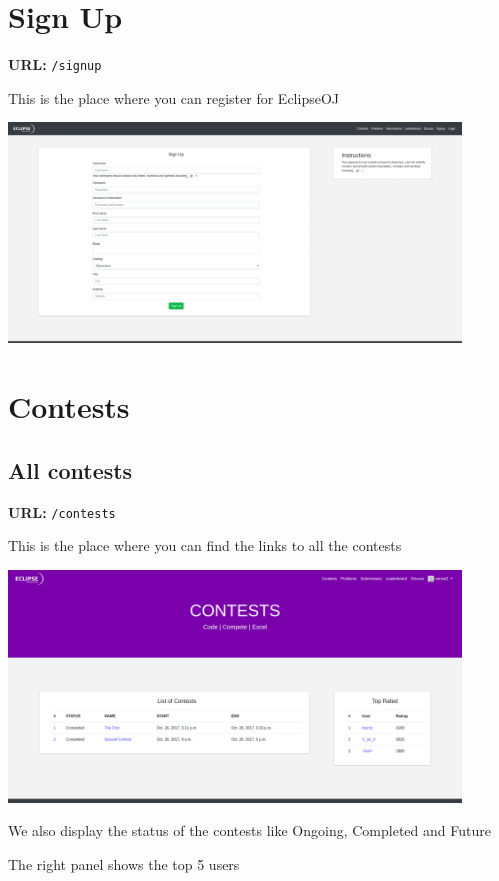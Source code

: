 \documentclass[hidelinks, a4paper,12pt, titlepage]{article}
\begin{document}
 
\section{Sign Up}
\textbf{URL:} \texttt{/signup}

This is the place where you can register for EclipseOJ
\begin{center}\includegraphics[width=0.9\textwidth]{Signup.png}\end{center}

\newpage
 
\section{Contests}
\subsection{All contests}
\textbf{URL:} \texttt{/contests}

This is the place where you can find the links to all the contests
\begin{center}\includegraphics[width=0.9\textwidth]{contests.png}\end{center}

We also display the status of the contests like Ongoing, Completed and Future

The right panel shows the top 5 users  
 
\end{document}

